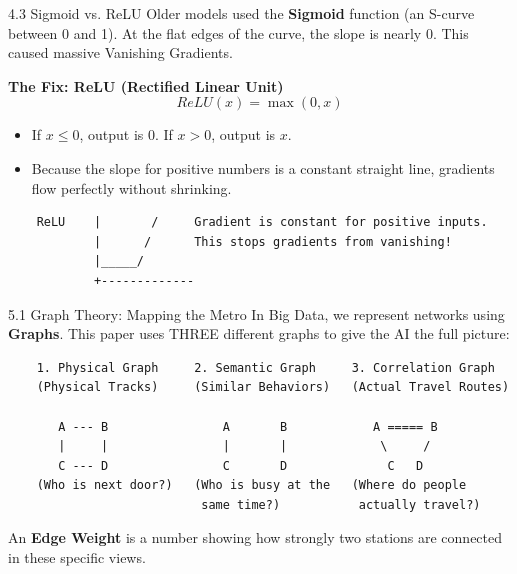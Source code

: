 \documentclass[aspectratio=169]{beamer}
\begin{document}
\begin{frame}[fragile]{4.3 Sigmoid vs. ReLU}
    \small
    Older models used the \textbf{Sigmoid} function (an S-curve between 0 and 1). At the flat edges of the curve, the slope is nearly 0. This caused massive Vanishing Gradients.

    \textbf{The Fix: ReLU (Rectified Linear Unit)}
    $$ReLU(x) = \max(0, x)$$
    \begin{itemize}
        \item If $x \leq 0$, output is 0. If $x > 0$, output is $x$.
        \item Because the slope for positive numbers is a constant straight line, gradients flow perfectly without shrinking.
    \end{itemize}

    \vspace{-0.2cm}
    \begin{verbatim}
    ReLU    |       /     Gradient is constant for positive inputs.
            |      /      This stops gradients from vanishing!
            |_____/
            +-------------
    \end{verbatim}
\end{frame}


\begin{frame}[fragile]{5.1 Graph Theory: Mapping the Metro}
    In Big Data, we represent networks using \textbf{Graphs}. This paper uses THREE different graphs to give the AI the full picture:
    
    \begin{verbatim}
    1. Physical Graph     2. Semantic Graph     3. Correlation Graph
    (Physical Tracks)     (Similar Behaviors)   (Actual Travel Routes)
    
       A --- B                A       B            A ===== B
       |     |                |       |             \     /
       C --- D                C       D              C   D
    (Who is next door?)   (Who is busy at the   (Where do people
                           same time?)           actually travel?)
    \end{verbatim}
    
    An \textbf{Edge Weight} is a number showing how strongly two stations are connected in these specific views.
\end{frame}
\end{document}
